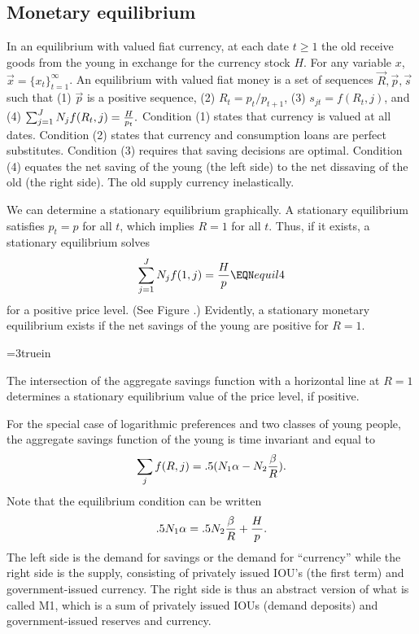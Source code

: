 \subsection{Monetary equilibrium}

In an equilibrium with valued fiat currency, at each
date $t \geq 1$ the old receive goods from the young
in exchange for the currency stock $H$.
 For any variable $x$,  $\vec x = \{x_t\}_{t=1}^\infty$.
  An equilibrium with valued fiat money is a set of
sequences $\vec R, \vec p, \vec s$
such that (1) $\vec p$ is a positive sequence, (2) $R_t =p_t / p_{t+1}$,
(3) $s_{jt} = f( R_t,j)$,  and  (4)
$ \sum_{j=1}^J N_j f(R_t, j) = {H \over p_t}.$
Condition (1) states that currency is valued at all dates.
Condition (2) states  that currency and consumption loans
are perfect substitutes.  Condition (3) requires that saving
decisions are optimal. Condition (4) equates the
net saving of the young (the left side) to the net dissaving
of the old (the right side). The old supply currency inelastically.

We can determine a stationary equilibrium graphically.  A stationary
equilibrium satisfies $p_t =p$ for all $t$, which implies
$R =1$ for all $t$.  Thus, if it exists, a stationary equilibrium
solves
$$ \sum_{j=1}^J N_j f(1, j) = {H \over p}  \EQN equil4
 $$
for a positive price level. (See Figure .) %
Evidently, a stationary monetary equilibrium exists if the net
savings of the young are positive for $R=1$.


\centerline{\epsfxsize=3truein}
\caption{The intersection of the aggregate savings function with a horizontal
line at $R=1$ determines  a stationary equilibrium value of the price level,
if positive.}
\endfigure

For the special case of logarithmic preferences and two
classes of young people, the aggregate savings function of the young is
time invariant and equal to
$$ \sum_j f(R,j) = .5(N_1 \alpha - N_2{\beta  \over R}). $$
Note that the equilibrium condition  can be written
$$ .5 N_1 \alpha = .5 N_2 {\beta  \over R} + {H  \over p}. $$
The left side is the demand for savings or the demand
for ``currency'' while the right side is the supply, consisting
of privately issued IOU's (the first term) and
government-issued currency.  The right side is thus
an abstract version of what is called  M1, which is a sum of privately
issued IOUs (demand deposits) and government-issued reserves and
currency.%

